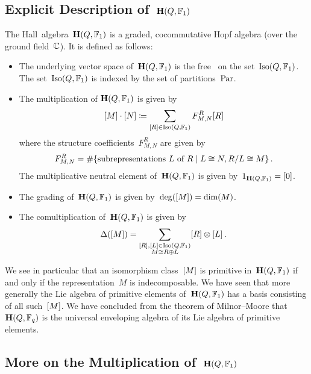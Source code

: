 \documentclass[a4paper,11pt]{scrartcl}
\begin{document}
\subsection{Explicit Description of~$\mathbf{H}(Q, \mathbb{F}_1)$}
\label{explicit description of hall algebra over F1}

The Hall~algebra~$\mathbf{H}(Q, \mathbb{F}_1)$ is a graded, cocommutative Hopf algebra (over the ground field~$\Complex$).
It is defined as follows:
\begin{itemize}
  \item
    The underlying vector space of~$\mathbf{H}(Q, \mathbb{F}_1)$ is the free~\vectorspace{$\Complex$} on the set~$\operatorname{Iso}(Q, \mathbb{F}_1)$.
    The set~$\operatorname{Iso}(Q, \mathbb{F}_1)$ is indexed by the set of partitions~$\mathrm{Par}$.
  \item
    The multiplication of$~\mathbf{H}(Q, \mathbb{F}_1)$ is given by
    \[
      [M] \cdot [N]
      \coloneqq
      \sum_{[R] \in \operatorname{Iso}(Q, \mathbb{F}_1)}
      F^R_{M,N} [R]
    \]
    where the structure coefficients~$F^R_{M,N}$ are given by
    \[
      F^R_{M,N}
      =
      \counting
      \{
        \text{subrepresentations~$L$ of~$R$}
      \suchthat
        L \cong N, R/L \cong M
      \} \,.
    \]
    The multiplicative neutral element of~$\mathbf{H}(Q, \mathbb{F}_1)$ is given by~$1_{\mathbf{H}(Q, \mathbb{F}_1)} = [0]$.
  \item
    The grading of~$\mathbf{H}(Q, \mathbb{F}_1)$ is given by~$\deg( [M] ) = \dim(M)$.
  \item
    The comultiplication of~$\mathbf{H}(Q, \mathbb{F}_1)$ is given by
    \[
      \Delta( [M] )
      =
      \sum_{
        \substack{
          [R], [L] \in \operatorname{Iso}(Q, \mathbb{F}_1) \\
          M \cong R \oplus L
        }
      }
      [R] \otimes [L] \,.
    \]
\end{itemize}

We see in particular that an isomorphism class~$[M]$ is primitive in~$\mathbf{H}(Q, \mathbb{F}_1)$ if and only if the representation~$M$ is indecomposable.
We have seen that more generally the Lie algebra of primitive elements of~$\mathbf{H}(Q, \mathbb{F}_1)$ has a basis consisting of all such~$[M]$.
We have concluded from the theorem of Milnor--Moore that~$\mathbf{H}(Q, \mathbb{F}_q)$ is the universal enveloping algebra of its Lie algebra of primitive elements.



\subsection{More on the Multiplication of~$\mathbf{H}(Q, \mathbb{F}_1)$}
\label{more on multiplication}
\end{document}
